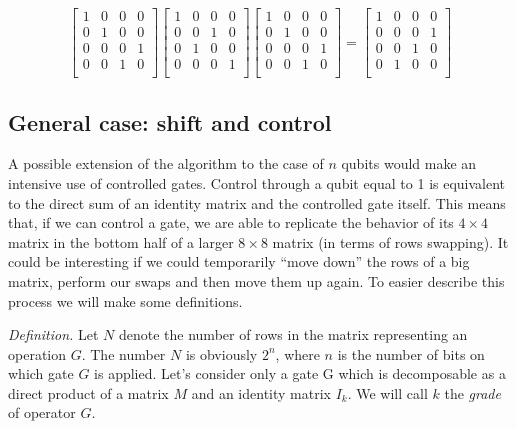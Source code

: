 \begin{equation*}
\begin{bmatrix}
1 & 0 & 0 & 0 \\
0 & 1 & 0 & 0 \\
0 & 0 & 0 & 1 \\
0 & 0 & 1 & 0 \\
\end{bmatrix}
\begin{bmatrix}
1 & 0 & 0 & 0 \\
0 & 0 & 1 & 0 \\
0 & 1 & 0 & 0 \\
0 & 0 & 0 & 1 \\
\end{bmatrix}
\begin{bmatrix}
1 & 0 & 0 & 0 \\
0 & 1 & 0 & 0 \\
0 & 0 & 0 & 1 \\
0 & 0 & 1 & 0 \\
\end{bmatrix}
=
\begin{bmatrix}
1 & 0 & 0 & 0 \\
0 & 0 & 0 & 1 \\
0 & 0 & 1 & 0 \\
0 & 1 & 0 & 0 \\
\end{bmatrix}
\end{equation*}

\subsection{General case: shift and control}

A possible extension of the algorithm to the case of $n$ qubits would make an intensive use of controlled gates. Control through a qubit equal to 1 is equivalent to the direct sum of an identity matrix and the controlled gate itself. This means that, if we can control a gate, we are able to replicate the behavior of its $4 \times 4$ matrix in the bottom half of a larger $8 \times 8$ matrix (in terms of rows swapping). It could be interesting if we could temporarily ``move down'' the rows of a big matrix, perform our swaps and then move them up again. To easier describe this process we will make some definitions.

\bigskip

\textit{Definition.} Let $N$ denote the number of rows in the matrix representing an operation $G$. The number $N$ is obviously $2^n$, where $n$ is the number of bits on which gate $G$ is applied. Let's consider only a gate G which is decomposable as a direct product of a matrix $M$ and an identity matrix $I_k$. We will call $k$ the \textit{grade} of operator $G$.

